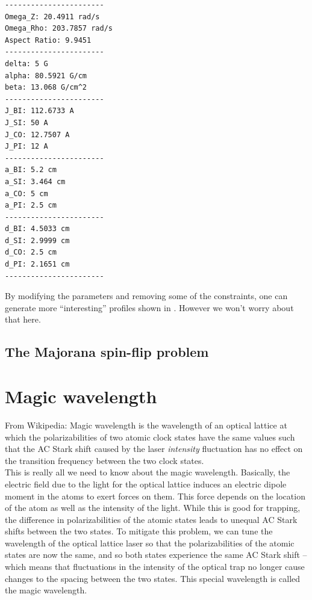\documentclass{book}
\theoremstyle{definition}
\begin{document}
\begin{lstlisting}
-----------------------
Omega_Z: 20.4911 rad/s
Omega_Rho: 203.7857 rad/s
Aspect Ratio: 9.9451
-----------------------
delta: 5 G
alpha: 80.5921 G/cm
beta: 13.068 G/cm^2
-----------------------
J_BI: 112.6733 A
J_SI: 50 A
J_CO: 12.7507 A
J_PI: 12 A
-----------------------
a_BI: 5.2 cm
a_SI: 3.464 cm
a_CO: 5 cm
a_PI: 2.5 cm
-----------------------
d_BI: 4.5033 cm
d_SI: 2.9999 cm
d_CO: 2.5 cm
d_PI: 2.1651 cm
-----------------------
\end{lstlisting}

By modifying the parameters and removing some of the constraints, one can generate more ``interesting'' profiles shown in \cite{allcoil}. However we won't worry about that here. 



\newpage





\subsection*{The Majorana spin-flip problem}

















\section*{Magic wavelength}



From Wikipedia: Magic wavelength is the wavelength of an optical lattice at which the polarizabilities of two atomic clock states have the same values such that the AC Stark shift caused by the laser \textit{intensity} fluctuation has no effect on the transition frequency between the two clock states.\\


This is really all we need to know about the magic wavelength. Basically, the electric field due to the light for the optical lattice induces an electric dipole moment in the atoms to exert forces on them. This force depends on the location of the atom as well as the intensity of the light. While this is good for trapping, the difference in polarizabilities of the atomic states leads to unequal AC Stark shifts between the two states. To mitigate this problem, we can tune the wavelength of the optical lattice laser so that the polarizabilities of the atomic states are now the same, and so both states experience the same AC Stark shift -- which means that fluctuations in the intensity of the optical trap no longer cause changes to the spacing between the two states. This special wavelength is called the magic wavelength. 
\end{document}
